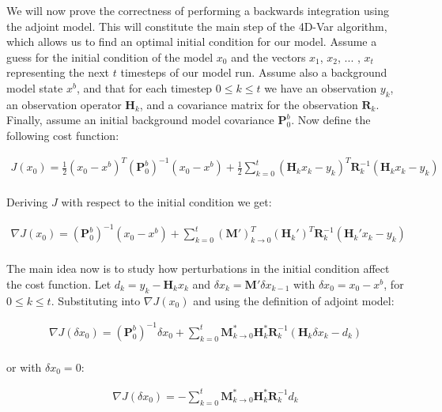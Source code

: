 \documentclass{article}
\begin{document}
We will now prove the correctness of performing a backwards integration using the adjoint model. This will constitute the main step of the 4D-Var algorithm, which allows us to find an optimal initial condition for our model. Assume a guess for the initial condition of the model $x_0$ and the vectors $x_1$, $x_2$, ... , $x_t$ representing the next $t$ timesteps of our model run. Assume also a background model state $x^b$, and that for each timestep $0 \leq k \leq t$ we have an observation $y_k$, an observation operator $\mathbf{H}_k$, and a covariance matrix for the observation $\mathbf{R}_k$. Finally, assume an initial background model covariance $\mathbf{P}_0^b$. Now define the following cost function:

\begin{gather*}
J(x_0) = \frac{1}{2} (x_0 - x^b)^T (\mathbf{P}_0^b)^{-1} (x_0 - x^b) + \frac{1}{2} \sum_{k = 0}^t (\mathbf{H}_k x_k - y_k)^T \mathbf{R}_k^{-1} (\mathbf{H}_k x_k - y_k) \\
\end{gather*}

Deriving $J$ with respect to the initial condition we get:

\begin{gather*}
\nabla J(x_0) = (\mathbf{P}_0^b)^{-1} (x_0 - x^b) + \sum_{k = 0}^t (\mathbf{M}')_{k \rightarrow 0}^T (\mathbf{H}_k')^T \mathbf{R}_k^{-1} (\mathbf{H}_k' x_k - y_k) \\
\end{gather*}

The main idea now is to study how perturbations in the initial condition affect the cost function. Let $d_k = y_k - \mathbf{H}_k x_k$ and $\delta x_k = \mathbf{M}' \delta x_{k - 1}$ with $\delta x_0 = x_0 - x^b$, for $0 \leq k \leq t$. Substituting into $\nabla J(x_0)$ and using the definition of adjoint model:

\begin{gather*}
\nabla J(\delta x_0) = (\mathbf{P}_0^b)^{-1} \delta x_0 + \sum_{k = 0}^t \mathbf{M}_{k \rightarrow 0}^* \mathbf{H}_k^* \mathbf{R}_k^{-1} (\mathbf{H}_k \delta x_k - d_k) \\
\end{gather*}

or with $\delta x_0 = 0$:

\begin{gather*}
\nabla J(\delta x_0) = - \sum_{k = 0}^t \mathbf{M}_{k \rightarrow 0}^* \mathbf{H}_k^* \mathbf{R}_k^{-1} d_k \\
\end{gather*}
\end{document}
